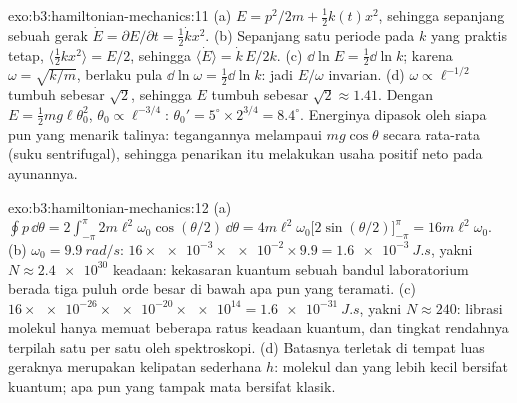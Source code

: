 \begin{solution}{exo:b3:hamiltonian-mechanics:11}
(a) $E = p^2/2m + \tfrac12 k(t)x^2$, sehingga sepanjang sebuah gerak $\dot E =
\partial E/\partial t = \tfrac12\dot kx^2$. (b) Sepanjang satu periode
pada $k$ yang praktis tetap, $\langle\tfrac12 kx^2\rangle = E/2$, sehingga
$\langle\dot E\rangle = \dot k\,E/2k$. (c) $\dd\ln E = \tfrac12\dd\ln
k$; karena $\omega = \sqrt{k/m}$, berlaku pula $\dd\ln\omega = \tfrac12\dd\ln k$:
jadi $E/\omega$ invarian. (d) $\omega \propto \ell^{-1/2}$ tumbuh
sebesar $\sqrt2$, sehingga $E$ tumbuh sebesar $\sqrt2 \approx 1.41$. Dengan $E = \tfrac12
mg\ell\theta_0^2$, $\theta_0 \propto \ell^{-3/4}$: $\theta_0' =
5^\circ \times 2^{3/4} = 8.4^\circ$. Energinya dipasok oleh siapa pun
yang menarik talinya: tegangannya melampaui $mg\cos\theta$ secara
rata-rata (suku sentrifugal), sehingga penarikan itu melakukan usaha
positif neto pada ayunannya.
\end{solution}

\begin{solution}{exo:b3:hamiltonian-mechanics:12}
(a) $\oint p\,\dd\theta = 2\int_{-\pi}^{\pi}2m\ell^2\omega_0
\cos(\theta/2)\,\dd\theta = 4m\ell^2\omega_0\big[2\sin(\theta/2)
\big]_{-\pi}^{\pi} = 16m\ell^2\omega_0$. (b) $\omega_0 =
\qty{9.9}{rad/s}$: $16 \times \num{e-3} \times \num{e-2} \times 9.9 =
\qty{1.6e-3}{J.s}$, yakni $N \approx \num{2.4e30}$ keadaan: kekasaran
kuantum sebuah bandul laboratorium berada tiga puluh orde besar
di bawah apa pun yang teramati. (c) $16 \times \num{e-26} \times
\num{e-20} \times \num{e14} = \qty{1.6e-31}{J.s}$, yakni $N \approx
240$: librasi molekul hanya memuat beberapa ratus keadaan kuantum,
dan tingkat rendahnya terpilah satu per satu oleh spektroskopi. (d) Batasnya
terletak di tempat luas  geraknya merupakan kelipatan sederhana
$h$: molekul dan yang lebih kecil bersifat kuantum; apa pun yang tampak
mata bersifat klasik.
\end{solution}

